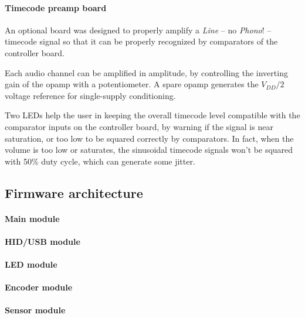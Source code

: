 \documentclass[a4paper,10pt]{article}
\begin{document}
\begin{multicols}{2}
\INSFIG


\paragraph{Timecode preamp board}
An optional board was designed to properly amplify a \emph{Line} -- no
\emph{Phono}! -- timecode signal so that it can be properly recognized by
comparators of the controller board.

Each audio channel can be amplified in amplitude, by controlling the inverting
gain of the opamp with a potentiometer. A spare opamp generates the $V_{DD}/2$
voltage reference for single-supply conditioning.

Two LEDs help the user in keeping the overall timecode level compatible with
the comparator inputs on the controller board, by warning if the signal is
near saturation, or too low to be squared correctly by comparators.
In fact, when the volume is too low or saturates, the sinusoidal timecode
signals won't be squared with 50\% duty cycle, which can generate some jitter.

\INSFIG


\subsection{Firmware architecture}

\TODO


\paragraph{Main module}
\TODO


\paragraph{HID/USB module}
\TODO


\paragraph{LED module}
\TODO


\paragraph{Encoder module}
\TODO


\paragraph{Sensor module}
\TODO



\end{multicols}
\end{document}
